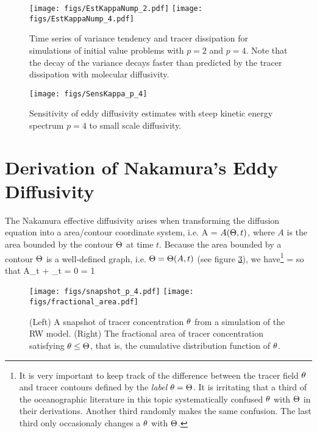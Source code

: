 \documentclass[11pt]{article}
\begin{document}
\begin{figure}[ht]
    \centering
    \texttt{[image: figs/EstKappaNump\_2.pdf]}
    \texttt{[image: figs/EstKappaNump\_4.pdf]}
    \caption{\small Time series of variance tendency and tracer dissipation for simulations of initial value problems with $p=2$ and $p=4$. Note that the decay of the variance decays faster than predicted by the tracer dissipation with molecular diffusivity. }
		    \label{EstKappaNum}
\end{figure}

\begin{figure}[ht]
    \centering
    \texttt{[image: figs/SensKappa\_p\_4]}
    \caption{\small Sensitivity of eddy diffusivity estimates with steep kinetic energy spectrum $p=4$ to small scale diffusivity.}
		    \label{SensKappa}
\end{figure}

\section{Derivation of Nakamura's Eddy Diffusivity}

The Nakamura effective diffusivity arises when transforming the diffusion equation into a area/contour coordinate system, i.e. A = $A(\Theta,t)$, where $A$ is the area bounded by the contour $\Theta$ at time $t$. Because the area bounded by a contour $\Theta$ is a well-defined graph, i.e. $\Theta = \Theta(A,t)$ (see figure \ref{SnapAndCDF}), we have\footnote{It is very important to keep track of the difference between the tracer field $\theta$ and tracer contours defined by the \textit{label} $\theta = \Theta$. It is irritating that a third of the oceanographic literature in this topic systematically confused $\theta$ with $\Theta$ in their derivations. Another third randomly makes the same confusion. The last third only  occasionaly changes a $\theta$ with $\Theta$.}
\beq
\Th = \vth[A(\Th,t),t]\com
\eeq
so that
\beq
\label{useful_relations}
A_t + \vth_t = 0 \qquad {}\qquad  {}  = 1\per
\eeq

\begin{figure}[ht]
    \centering
    \texttt{[image: figs/snapshot\_p\_4.pdf]}
    \texttt{[image: figs/fractional\_area.pdf]}
    \caption{\small (Left) A snapshot of tracer concentration $\theta$ from a simulation
    		of the RW model. (Right) The fractional area  of tracer concentration
		satisfying $\theta\leq\Theta$, that is, the cumulative distribution function of $\theta$.}
		    \label{SnapAndCDF}
\end{figure}
\end{document}
